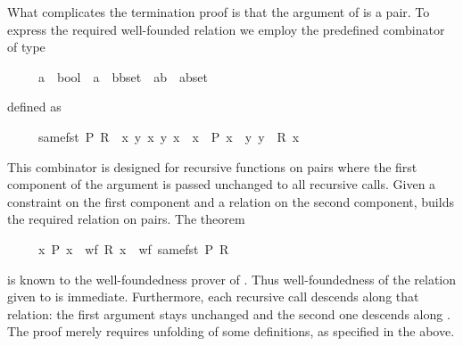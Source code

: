 \begin{isabellebody}
\begin{isamarkuptext}
What complicates the termination proof is that the argument of 
is a pair. To express the required well-founded relation we employ the
predefined combinator  of type
\begin{isabelle}%
\ \ \ \ \ {\isacharparenleft}{\isacharprime}a\ {\isasymRightarrow}\ bool{\isacharparenright}\ {\isasymRightarrow}\ {\isacharparenleft}{\isacharprime}a\ {\isasymRightarrow}\ {\isacharparenleft}{\isacharprime}b{\isasymtimes}{\isacharprime}b{\isacharparenright}set{\isacharparenright}\ {\isasymRightarrow}\ {\isacharparenleft}{\isacharparenleft}{\isacharprime}a{\isasymtimes}{\isacharprime}b{\isacharparenright}\ {\isasymtimes}\ {\isacharparenleft}{\isacharprime}a{\isasymtimes}{\isacharprime}b{\isacharparenright}{\isacharparenright}set%
\end{isabelle}
defined as
\begin{isabelle}%
\ \ \ \ \ same{\isacharunderscore}fst\ P\ R\ {\isasymequiv}\ {\isacharbraceleft}{\isacharparenleft}{\isacharparenleft}x{\isacharprime}{\isacharcomma}\ y{\isacharprime}{\isacharparenright}{\isacharcomma}\ x{\isacharcomma}\ y{\isacharparenright}{\isachardot}\ x{\isacharprime}\ {\isacharequal}\ x\ {\isasymand}\ P\ x\ {\isasymand}\ {\isacharparenleft}y{\isacharprime}{\isacharcomma}\ y{\isacharparenright}\ {\isasymin}\ R\ x{\isacharbraceright}%
\end{isabelle}
This combinator is designed for
recursive functions on pairs where the first component of the argument is
passed unchanged to all recursive calls. Given a constraint on the first
component and a relation on the second component,  builds the
required relation on pairs.  The theorem
\begin{isabelle}%
\ \ \ \ \ {\isacharparenleft}{\isasymAnd}x{\isachardot}\ P\ x\ {\isasymLongrightarrow}\ wf\ {\isacharparenleft}R\ x{\isacharparenright}{\isacharparenright}\ {\isasymLongrightarrow}\ wf\ {\isacharparenleft}same{\isacharunderscore}fst\ P\ R{\isacharparenright}%
\end{isabelle}
is known to the well-foundedness prover of .  Thus
well-foundedness of the relation given to  is immediate.
Furthermore, each recursive call descends along that relation: the first
argument stays unchanged and the second one descends along . The proof merely requires unfolding of some definitions, as specified in
the  above.


\end{isamarkuptext}
\end{isabellebody}
